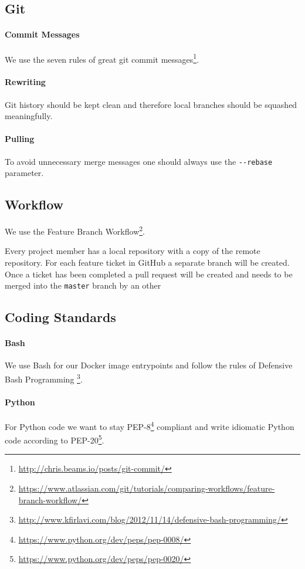 \subsection{Git}\label{git}
\paragraph{Commit Messages}
We use the seven rules of great git commit
messages\footnote{\url{http://chris.beams.io/posts/git-commit/}}.

\paragraph{Rewriting}
Git history should be kept clean and therefore local branches should be
squashed meaningfully.

\paragraph{Pulling}
To avoid unnecessary merge messages one should always use the
\texttt{-\/-rebase} parameter.

\subsection{Workflow}\label{workflow}
We use the Feature Branch Workflow\footnote{\url{https://www.atlassian.com/git/tutorials/comparing-workflows/feature-branch-workflow/}}.

Every project member has a local repository with a copy of the remote
repository. For each feature ticket in GitHub a separate branch
will be created. Once a ticket has been completed a pull request will be
created and needs to be merged into the \texttt{master} branch by an other 

\subsection{Coding Standards}

\paragraph{Bash} We use Bash for our Docker image entrypoints and follow
the rules of Defensive Bash Programming \footnote{\url{http://www.kfirlavi.com/blog/2012/11/14/defensive-bash-programming/}}.

\paragraph{Python} For Python code we want to stay PEP-8\footnote{\url{https://www.python.org/dev/peps/pep-0008/}} compliant and write idiomatic Python code according to PEP-20\footnote{\url{https://www.python.org/dev/peps/pep-0020/}}.

